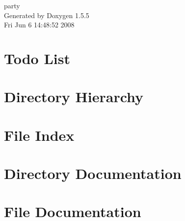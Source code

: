 \documentclass[a4paper]{book}
\begin{document}
\begin{titlepage}
\vspace*{7cm}
\begin{center}
{\Large party }\\
\vspace*{1cm}
{\large Generated by Doxygen 1.5.5}\\
\vspace*{0.5cm}
{\small Fri Jun 6 14:48:52 2008}\\
\end{center}
\end{titlepage}
\clearemptydoublepage
{}
\tableofcontents
\clearemptydoublepage
{}
\chapter{Todo List}

\chapter{Directory Hierarchy}

\chapter{File Index}

\chapter{Directory Documentation}

\chapter{File Documentation}






























\printindex
\end{document}
